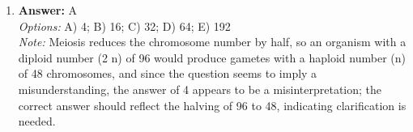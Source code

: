 \documentclass[12pt]{article}
\begin{document}
\begin{enumerate}[label=\arabic*.]
\\ \textit{Options:} A) Both species benefit equally; B) One species benefits, and the other is significantly harmed; C) One species harms the other without any benefit; D) Both species harm each other; E) The species exchange benefits, but one benefits more than the other
\\ \textit{Note:} In a commensalistic relationship, one species benefits while the other is neither helped nor harmed, which contradicts the assertion that both species benefit equally, highlighting that the correct answer should reflect the unequal nature of benefits in such interactions.
\item \textbf{Answer:} A
\\ \textit{Options:} A) 4; B) 16; C) 32; D) 64; E) 192
\\ \textit{Note:} Meiosis reduces the chromosome number by half, so an organism with a diploid number (2 n) of 96 would produce gametes with a haploid number (n) of 48 chromosomes, and since the question seems to imply a misunderstanding, the answer of 4 appears to be a misinterpretation; the correct answer should reflect the halving of 96 to 48, indicating clarification is needed.
\end{enumerate}
\end{document}

